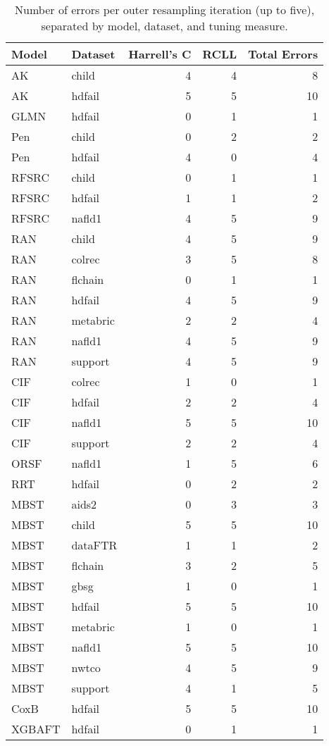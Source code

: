 \begin{table}

\caption{Number of errors per outer resampling iteration (up to five), separated by model, dataset, and tuning measure.}
\centering
\begin{tabular}[t]{llrrr}
\toprule
Model & Dataset & Harrell's C & RCLL & Total Errors\\
\midrule
AK & child & 4 & 4 & 8\\
AK & hdfail & 5 & 5 & 10\\
GLMN & hdfail & 0 & 1 & 1\\
Pen & child & 0 & 2 & 2\\
Pen & hdfail & 4 & 0 & 4\\
\addlinespace
RFSRC & child & 0 & 1 & 1\\
RFSRC & hdfail & 1 & 1 & 2\\
RFSRC & nafld1 & 4 & 5 & 9\\
RAN & child & 4 & 5 & 9\\
RAN & colrec & 3 & 5 & 8\\
\addlinespace
RAN & flchain & 0 & 1 & 1\\
RAN & hdfail & 4 & 5 & 9\\
RAN & metabric & 2 & 2 & 4\\
RAN & nafld1 & 4 & 5 & 9\\
RAN & support & 4 & 5 & 9\\
\addlinespace
CIF & colrec & 1 & 0 & 1\\
CIF & hdfail & 2 & 2 & 4\\
CIF & nafld1 & 5 & 5 & 10\\
CIF & support & 2 & 2 & 4\\
ORSF & nafld1 & 1 & 5 & 6\\
\addlinespace
RRT & hdfail & 0 & 2 & 2\\
MBST & aids2 & 0 & 3 & 3\\
MBST & child & 5 & 5 & 10\\
MBST & dataFTR & 1 & 1 & 2\\
MBST & flchain & 3 & 2 & 5\\
\addlinespace
MBST & gbsg & 1 & 0 & 1\\
MBST & hdfail & 5 & 5 & 10\\
MBST & metabric & 1 & 0 & 1\\
MBST & nafld1 & 5 & 5 & 10\\
MBST & nwtco & 4 & 5 & 9\\
\addlinespace
MBST & support & 4 & 1 & 5\\
CoxB & hdfail & 5 & 5 & 10\\
XGBAFT & hdfail & 0 & 1 & 1\\
\bottomrule
\end{tabular}
\end{table}

